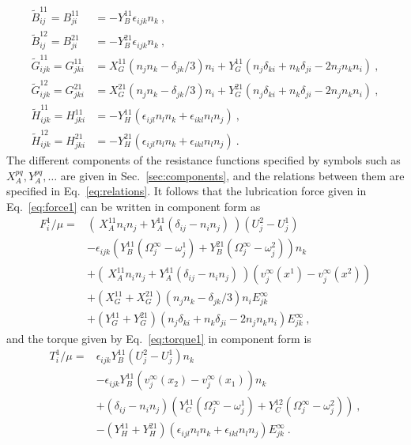 \documentclass[reprint, amsmath,amssymb,aps,pre,onecolumn,notitlepage%
]{revtex4-1}
\begin{document}
\begin{equation}
	\begin{split}
		\widetilde{B}^{11}_{ij}=B^{11}_{ji}&=-Y_B^{11}\epsilon_{ijk}n_k\ ,\\
		\widetilde{B}^{12}_{ij}=B^{21}_{ji}&=-Y_B^{21}\epsilon_{ijk}n_k\ ,\\
		\widetilde{G}^{11}_{ijk}=G^{11}_{jki}&=X_G^{11}(n_jn_k-\delta_{jk}/3)n_i+Y_G^{11}(n_j\delta_{ki}+n_k\delta_{ji}-2n_jn_kn_i)\ ,\\
		\widetilde{G}^{12}_{ijk}=G^{21}_{jki}&=X_G^{21}(n_jn_k-\delta_{jk}/3)n_i+Y_G^{21}(n_j\delta_{ki}+n_k\delta_{ji}-2n_jn_kn_i)\ ,\\
		\widetilde{H}^{11}_{ijk}=H^{11}_{jki}&=-Y_H^{11}(\epsilon_{ijl} n_l n_k+\epsilon_{ikl} n_l n_j)\ ,\\
		\widetilde{H}^{12}_{ijk}=H^{21}_{jki}&=-Y_H^{21}(\epsilon_{ijl} n_l n_k+\epsilon_{ikl} n_l n_j)\ .
	\end{split}
\end{equation}
The different components of the resistance functions specified by symbols such as $X_A^{pq},Y_A^{pq},\ldots$ are given in Sec.~\ref{sec:components}, and the relations between them are specified in Eq.~\eqref{eq:relations}.  It follows that the lubrication force given in Eq.~\eqref{eq:force1} can be written in component form as
\begin{equation}
	\begin{split}
		F^1_i/\mu=& (\ X_A^{11}n_in_j+Y_A^{11}(\delta_{ij}-n_in_j)\ )(U^2_j-U^1_j)\\
		&-\epsilon_{ijk} \left(Y_B^{11}(\Omega_j^\infty-\omega_j^1)+Y_B^{21}(\Omega_j^\infty-\omega_j^2)\right) n_k\\
& +(\ X_A^{11}n_in_j+Y_A^{11}(\delta_{ij}-n_in_j)\ )(v_j^\infty(x^1)-v_j^\infty(x^2))\\
		&+(X_G^{11}+X_G^{21})(n_jn_k-\delta_{jk}/3)n_iE^\infty_{jk}\\
		&+(Y_G^{11}+Y_G^{21})(n_j\delta_{ki}+n_k\delta_{ji}-2n_jn_kn_i)E^\infty_{jk}\ , 
	\end{split}
	\label{eq:force}
\end{equation}
and the torque given by Eq.~\eqref{eq:torque1} in component form is
\begin{equation}
	\begin{split}
		T^1_i/\mu=& \epsilon_{ijk}Y_B^{11}(U^2_j-U^1_j)n_k\\
		&-\epsilon_{ijk}Y_B^{11}(v^\infty_j(x_2)-v^\infty_j(x_1))n_k\\
		&+(\delta_{ij}-n_in_j)\left(Y_C^{11}(\Omega^\infty_j-\omega^1_j)+Y_C^{12}(\Omega^\infty_j-\omega^2_j)\right)\ ,\\
		&- (Y^{11}_H+Y^{21}_H)(\epsilon_{ijl} n_l n_k+\epsilon_{ikl} n_l n_j) E^\infty_{jk}\ .
	\end{split}
	\label{eq:t1_comp}
\end{equation}
\end{document}
